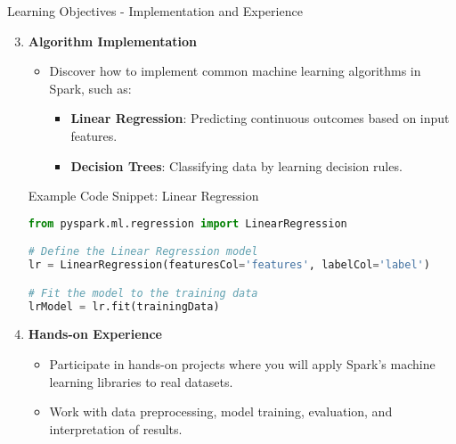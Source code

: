 \documentclass[aspectratio=169]{beamer}
\begin{document}
\begin{frame}[fragile]{Learning Objectives - Implementation and Experience}
  \begin{enumerate}
    \setcounter{enumi}{2} %
    \item \textbf{Algorithm Implementation}
    \begin{itemize}
      \item Discover how to implement common machine learning algorithms in Spark, such as:
      \begin{itemize}
        \item \textbf{Linear Regression}: Predicting continuous outcomes based on input features.
        \item \textbf{Decision Trees}: Classifying data by learning decision rules.
      \end{itemize}
    \end{itemize}
    
    \begin{block}{Example Code Snippet: Linear Regression}
      \begin{lstlisting}[language=python]
from pyspark.ml.regression import LinearRegression

# Define the Linear Regression model
lr = LinearRegression(featuresCol='features', labelCol='label')

# Fit the model to the training data
lrModel = lr.fit(trainingData)
      \end{lstlisting}
    \end{block}
    
    \item \textbf{Hands-on Experience}
    \begin{itemize}
      \item Participate in hands-on projects where you will apply Spark’s machine learning libraries to real datasets.
      \item Work with data preprocessing, model training, evaluation, and interpretation of results.
    \end{itemize}
  \end{enumerate}
\end{frame}
\end{document}
